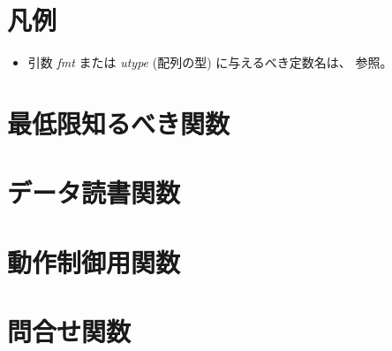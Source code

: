 \label{chap:capi}

\renewcommand{\APILabel}[1]{\label{capi:#1}}
\renewcommand{\APILink}[2]{#2 (p. \pageref{capi:#1})}

\section{凡例}

\begin{itemize}
 \item
  引数 {\it fmt} または {\it utype} (配列の型) に与えるべき定数名は、
  参照。
\end{itemize}

\clearpage
\section{最低限知るべき関数}









\clearpage
\section{データ読書関数}







\clearpage
\section{動作制御用関数}









\clearpage
\section{問合せ関数}










